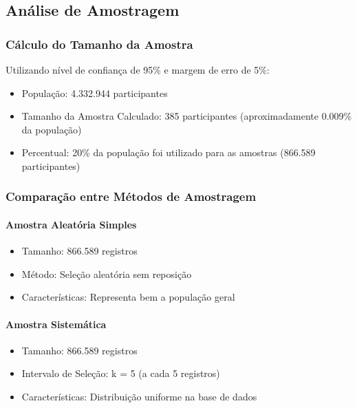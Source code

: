 \documentclass[12pt,a4paper]{article}
\begin{document}
\subsection{Análise de Amostragem}

\subsubsection{Cálculo do Tamanho da Amostra}

Utilizando nível de confiança de 95\% e margem de erro de 5\%:

\begin{itemize}
    \item População: 4.332.944 participantes
    \item Tamanho da Amostra Calculado: 385 participantes (aproximadamente 0.009\% da população)
    \item Percentual: 20\% da população foi utilizado para as amostras (866.589 participantes)
\end{itemize}

\subsubsection{Comparação entre Métodos de Amostragem}

\paragraph{Amostra Aleatória Simples}

\begin{itemize}
    \item Tamanho: 866.589 registros
    \item Método: Seleção aleatória sem reposição
    \item Características: Representa bem a população geral
\end{itemize}

\paragraph{Amostra Sistemática}

\begin{itemize}
    \item Tamanho: 866.589 registros
    \item Intervalo de Seleção: k = 5 (a cada 5 registros)
    \item Características: Distribuição uniforme na base de dados
\end{itemize}
\end{document}
